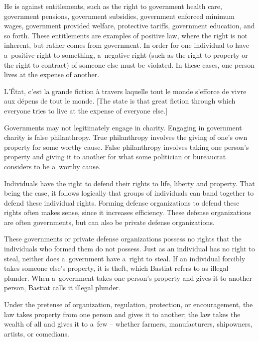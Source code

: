 He is against entitlements, such as the right to government health care, government pensions, government subsidies, government enforced minimum wages, government provided welfare, protective tariffs, government education, and so forth. These entitlements are examples of positive law, where the right is not inherent, but rather comes from government. In order for one individual to have a~positive right to something, a~negative right (such as the right to property or the right to contract) of someone else must be violated. In these cases, one person lives at the expense of another.



L'État, c'est la grande fiction à travers laquelle tout le monde s'efforce de vivre aux dépens de tout le monde. 
\parencite[][p.332]{bastiat_ce_1873} %
 [The state is that great fiction through which everyone tries to live at the expense of everyone else.]



Governments may not legitimately engage in charity. Engaging in government charity is false philanthropy. True philanthropy involves the giving of one's own property for some worthy cause. False philanthropy involves taking one person's property and giving it to another for what some politician or bureaucrat considers to be a~worthy cause.



Individuals have the right to defend their rights to life, liberty and property. That being the case, it follows logically that groups of individuals can band together to defend these individual rights. Forming defense organizations to defend these rights often makes sense, since it increases efficiency. These defense organizations are often governments, but can also be private defense organizations.



These governments or private defense organizations possess no rights that the individuals who formed them do not possess. Just as an individual has no right to steal, neither does a~government have a~right to steal. If an individual forcibly takes someone else's property, it is theft, which Bastiat refers to as illegal plunder. When a~government takes one person's property and gives it to another person, Bastiat calls it illegal plunder.



Under the pretense of organization, regulation, protection, or encouragement, the law takes property from one person and gives it to another; the law takes the wealth of all and gives it to a~few -- whether farmers, manufacturers, shipowners, artists, or comedians. 
\parencite[][p.13]{bastiat_law_1998}%




